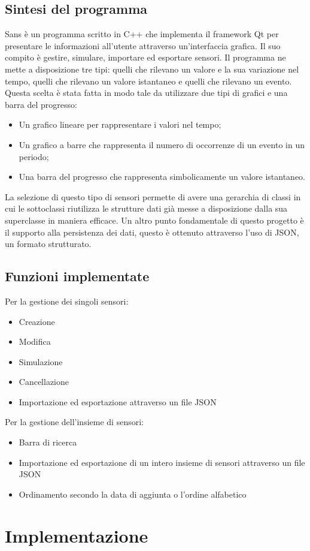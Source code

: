 \documentclass[a4paper]{article}
\begin{document}
\subsection{Sintesi del programma}
Sans è un programma scritto in C++ che implementa il framework Qt per presentare le informazioni all'utente attraverso un'interfaccia grafica. Il suo compito è gestire, simulare, importare ed esportare sensori.
Il programma ne mette a disposizione tre tipi: quelli che rilevano un valore e la sua variazione nel tempo, quelli che rilevano un valore istantaneo e quelli che rilevano un evento.
Questa scelta è stata fatta in modo tale da utilizzare due tipi di grafici e una barra del progresso: 
\begin{itemize}
    \item Un grafico lineare per rappresentare i valori nel tempo;
    \item Un grafico a barre che rappresenta il numero di occorrenze di un evento in un periodo;
    \item Una barra del progresso che rappresenta simbolicamente un valore istantaneo.
\end{itemize}
La selezione di questo tipo di sensori permette di avere una gerarchia di classi in cui le sottoclassi riutilizza le strutture dati già messe a disposizione dalla sua superclasse in maniera efficace.
Un altro punto fondamentale di questo progetto è il supporto alla persistenza dei dati, questo è ottenuto attraverso l'uso di JSON, un formato strutturato.
\subsection{Funzioni implementate}
Per la gestione dei singoli sensori:
\begin{itemize}
    \item Creazione
    \item Modifica
    \item Simulazione
    \item Cancellazione
    \item Importazione ed esportazione attraverso un file JSON
\end{itemize}
Per la gestione dell'insieme di sensori:
\begin{itemize}
    \item Barra di ricerca
    \item Importazione ed esportazione di un intero insieme di sensori attraverso un file JSON
    \item Ordinamento secondo la data di aggiunta o l'ordine alfabetico
\end{itemize}
\clearpage
\section{Implementazione}
\end{document}
